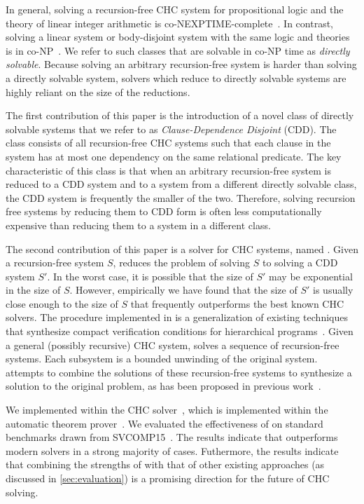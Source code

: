 In general, solving a recursion-free CHC system for
propositional logic and the theory of linear integer arithmetic is
co-NEXPTIME-complete~\cite{rummer13b}.
%
In contrast, solving a linear system or body-disjoint system with the
same logic and theories is in co-NP~\cite{rummer13b}.
%
We refer to such classes that are solvable in co-NP time as
\emph{directly solvable}.
%
Because solving an arbitrary recursion-free system is harder than
solving a directly solvable system, solvers which reduce to directly
solvable systems are highly reliant on the size of the reductions.

The first contribution of this paper is the introduction of a novel
class of directly solvable systems that we refer to as
\emph{Clause-Dependence Disjoint} (CDD).
%
The class consists of all recursion-free CHC systems such that each
clause in the system has at most one dependency on the same relational
predicate.
%
The key characteristic of this class is that when an arbitrary
recursion-free system is reduced to a CDD system and to a system from
a different directly solvable class, the CDD system is frequently the
smaller of the two.
%
Therefore, solving recursion free systems by reducing them to CDD form
is often less computationally expensive than reducing them to a
system in a different class.

The second contribution of this paper is a solver for CHC systems,
named \sys.
%
Given a recursion-free system $S$, \sys reduces the problem of solving
$S$ to solving a CDD system $S'$.
%
In the worst case, it is possible that the size of $S'$ may be
exponential in the size of $S$.
%
However, empirically we have found that the size of $S'$ is usually
close enough to the size of $S$ that \sys frequently outperforms the best
known CHC solvers.
%
The procedure implemented in \sys is a generalization of existing
techniques that synthesize compact verification conditions for
hierarchical programs~\cite{flanagan01,lal-qadeer15}.
%
Given a general (possibly recursive) CHC system, \sys solves a
sequence of recursion-free systems.
%
Each subsystem is a bounded unwinding of the original system. \sys
attempts to combine the solutions of these recursion-free systems to
synthesize a solution to the original problem, as has been proposed
in previous work~\cite{rummer13b}.

We implemented \sys within the \duality CHC solver~\cite{bjorner13},
which is implemented within the \zthree automatic theorem
prover~\cite{moura08}.
%
We evaluated the effectiveness of \sys on standard benchmarks drawn
from SVCOMP15~\cite{svcomp15}.
%
The results indicate that \sys outperforms modern solvers in a strong
majority of cases.
%
Futhermore, the results indicate that combining the strengths of \sys
with that of other existing approaches (as discussed in
\autoref{sec:evaluation}) is a promising direction for the future of
CHC solving.

